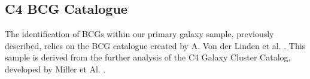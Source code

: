 \subsection{C4 BCG Catalogue}
The identification of BCGs within our primary galaxy sample, previously described, relies on the BCG catalogue created by A. Von der Linden et al. \cite{2007MNRAS.379..867V, 2009yCat..73790867V}. This sample is derived from the further analysis of the C4 Galaxy Cluster Catalog,  developed by Miller et Al.  \cite{2005AJ....130..968M}.

